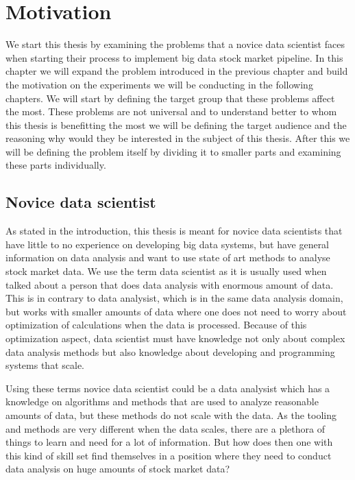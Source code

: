 \chapter{Motivation}
\label{chapter:problem}

We start this thesis by examining the problems that a novice data scientist faces when starting their process to implement big data stock market pipeline.
In this chapter we will expand the problem introduced in the previous chapter and build the motivation on the experiments we will be conducting in the following chapters.
We will start by defining the target group that these problems affect the most.
These problems are not universal and to understand better to whom this thesis is benefitting the most we will be defining the target audience and the reasoning why would they be interested in the subject of this thesis.
After this we will be defining the problem itself by dividing it to smaller parts and examining these parts individually.

\section{Novice data scientist}

As stated in the introduction, this thesis is meant for novice data scientists that have little to no experience on developing big data systems, but have general information on data analysis and want to use state of art methods to analyse stock market data.
We use the term data scientist as it is usually used when talked about a person that does data analysis with enormous amount of data.
This is in contrary to data analysist, which is in the same data analysis domain, but works with smaller amounts of data where one does not need to worry about optimization of calculations when the data is processed. \cite{voulgaris}
Because of this optimization aspect, data scientist must have knowledge not only about complex data analysis methods but also knowledge about developing and programming systems that scale.

Using these terms novice data scientist could be a data analysist which has a knowledge on algorithms and methods that are used to analyze reasonable amounts of data, but these methods do not scale with the data.
As the tooling and methods are very different when the data scales, there are a plethora of things to learn and need for a lot of information.
But how does then one with this kind of skill set find themselves in a position where they need to conduct data analysis on huge amounts of stock market data?

